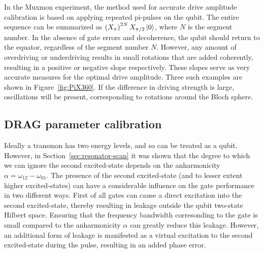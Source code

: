         In the Muxmon experiment, the method used for accurate drive amplitude calibration is based on applying repeated pi-pulses on the qubit. The entire sequence can be summarized as $\left( X_{\pi} \right)^{2N} X_{\pi/2} \ket{0}$, where $N$ is the segment number. In the absence of gate errors and decoherence, the qubit should return to the equator, regardless of the segment number $N$. However, any amount of overdriving or underdriving results in small rotations that are added coherently, resulting in a positive or negative slope respectively. These slopes serve as very accurate measures for the optimal drive amplitude. Three such examples are shown in Figure~\ref{fig:PiX360}. If the difference in driving strength is large, oscillations will be present, corresponding to rotations around the Bloch sphere.

      \subsection{DRAG parameter calibration}
        \label{ssec:DRAG parameter calibration}

        Ideally a transmon has two energy levels, and so can be treated as a qubit. However, in Section~\ref{sec:resonator-scan} it was shown that the degree to which we can ignore the second excited-state depends on the anharmonicity $\alpha=\omega_{12} - \omega_{01}$.  The presence of the second excited-state (and to lesser extent higher excited-states) can have a considerable influence on the gate performance in two different ways. First of all gates can cause a direct excitation into the second excited-state, thereby resulting in leakage outside the qubit two-state Hilbert space. Ensuring that the frequency bandwidth corresonding to the gate is small compared to the anharmonicity $\alpha$ can greatly reduce this leakage. However, an additional form of leakage is manifested as a virtual excitation to the second excited-state during the pulse, resulting in an added phase error.

